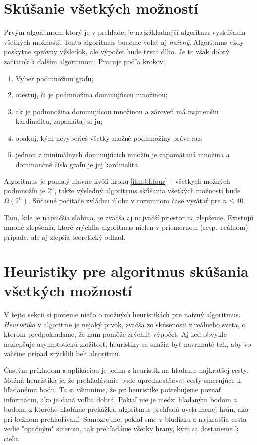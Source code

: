\section{Skúšanie všetkých možností}

Prvým algoritmom, ktorý je v prehľade, je najzákladnejší algoritmu vyskúšania 
všetkých možností. Tento algoritmus budeme volať aj \emph{naivný}. Algoritmus 
vždy poskytne správny výsledok, ale výpočet bude trvať dlho. Je 
to však dobrý začiatok k ďalším algoritmom. Pracuje podľa krokov:

\begin{enumerate}
	\item \label{itm:bf:one} Vyber podmnožinu grafu;
	\item \label{itm:bf:two} otestuj, či je podmnožina dominujúcou množinou;
	\item \label{itm:bf:three} ak je podmnožina dominujúcou množinou a zároveň má najmenšiu 
kardinalitu, zapamätaj si ju;
	\item \label{itm:bf:four} opakuj, kým nevyberieš všetky možné podmnožiny práve raz;
	\item \label{itm:bf:five} jednou z minimálnych dominujúcich množín je zapamätaná množina a 
dominančné číslo grafu je jej kardinalita.
\end{enumerate}

Algoritmus je pomalý hlavne kvôli kroku \ref{itm:bf:four} -- všetkých možných 
podmnožín je $2^n$, takže výsledný algoritmus skúšania všetkých možností bude 
$\Omega (2^n)$. Súčasné počítače zvládnu úlohu v rozumnom čase vyrátať pre 
$n\le 40$.

Tam, kde je najväčšia slabina, je zväčša aj najväčší priestor na zlepšenie. 
Existujú mnohé zlepšenia, ktoré zrýchlia algoritmus nielen v priemernom 
(resp.~reálnom) prípade, ale aj zlepšia teoretický odhad.

\section{Heuristiky pre algoritmus skúšania všetkých možností}

V tejto sekcii si povieme niečo o možných heuristikách pre naivný algoritmus. 
\emph{Heuristika} v algoritme je nejaký prvok, zväčša zo skúsenosti z reálneho 
sveta, o ktorom predpokladáme, že nám pomôže zrýchliť výpočet. Aj keď obvykle 
nezlepšuje asymptotickú zložitosť, heuristiky sa snažia byť navrhnuté tak, aby 
vo väčšine prípad zrýchlili beh algoritmu.

Častým príkladom a aplikáciou je jedna z heuristík na hľadanie najkratšej 
cesty. Možná heuristika je, že prehľadávanie bude uprednostňovať cesty 
smerujúce k hľadanému bodu. Tu si všimnime, že pri heuristike potrebujeme 
poznať informáciu, ako je daná voľba dobrá. Pokiaľ nie je medzi hľadaným bodom 
a bodom, z ktorého hľadáme prekážka, algoritmus prehľadá oveľa menej hrán, 
ako pri bežnom prehľadávaní. Samozrejme, pokiaľ sme v bludisku a najkratšia 
cesta vedie "opačným" smerom, tak prehľadáme všetky hrany, kým sa dostaneme k 
cieľu.


